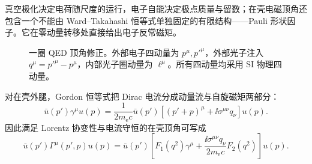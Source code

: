 
真空极化决定电荷随尺度的运行，电子自能决定极点质量与留数；在壳电磁顶角还包含一个不能由 Ward--Takahashi 恒等式单独固定的有限结构——Pauli 形状因子。它在零动量转移处直接给出电子反常磁矩。

\begin{figure}[htbp]
 \centering
 
 \caption{一圈 QED 顶角修正。外部电子四动量为 \(p^\mu,p'^\mu\)，外部光子注入 \(q^\mu=p'^\mu-p^\mu\)，内部光子圈动量为 \(\ell^\mu\)。所有四动量均采用 SI 物理四动量。}
 \label{fig:vertex-correction-r14}
\end{figure}

对在壳外腿，Gordon 恒等式把 Dirac 电流分成动量流与自旋磁矩两部分：
\begin{equation}
 \boxed{
 \bar u(p')\gamma^\mu u(p)
 =\frac1{2m_{\mathrm e} c}\bar u(p')
 \left[(p'+p)^\mu+\ii\sigma^{\mu\nu}q_\nu\right]u(p).}
 \label{eq:gordon-identity-r14}
\end{equation}
因此满足 Lorentz 协变性与电流守恒的在壳顶角可写成
\begin{equation}
 \boxed{
 \bar u(p')\Gamma^\mu(p',p)u(p)
 =\bar u(p')\left[
 F_1(q^2)\gamma^\mu
 +\frac{\ii\sigma^{\mu\nu}q_\nu}{2m_{\mathrm e} c}F_2(q^2)
 \right]u(p).}
 \label{eq:form-factor-definition-r14}
\end{equation}

